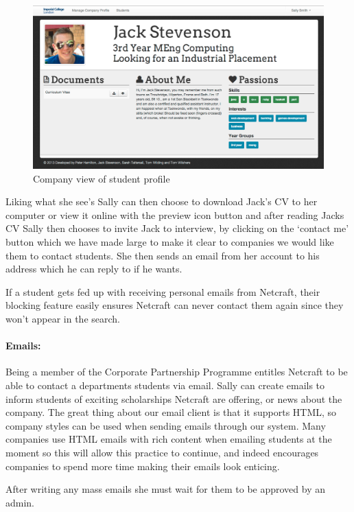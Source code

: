     \begin{figure}[H]\centering
    \includegraphics[scale=0.3]{images/user_experiences/company/jack_profile}
    \caption{Company view of student profile}
    \end{figure}

    Liking what she see's Sally can then choose to download Jack's CV to her computer or view it online with the preview icon button and after reading Jacks CV Sally then chooses to invite Jack to interview, by clicking on the `contact me' button which we have made large to make it clear to companies we would like them to contact students. She then sends an email from her account to his address which he can reply to if he wants. 

    If a student gets fed up with receiving personal emails from Netcraft, their blocking feature easily ensures Netcraft can never contact them again since they won't appear in the search.

  \paragraph{Emails:}
    Being a member of the Corporate Partnership Programme entitles Netcraft to be able to contact a departments students via email. Sally can create emails to inform students of exciting scholarships Netcraft are offering, or news about the company. The great thing about our email client is that it supports HTML, so company styles can be used when sending emails through our system. Many companies use HTML emails with rich content when emailing students at the moment so this will allow this practice to continue, and indeed encourages companies to spend more time making their emails look enticing.

    After writing any mass emails she must wait for them to be approved by an admin. 

